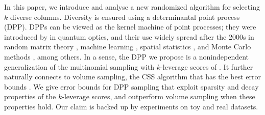 \documentclass[twoside,11pt]{book}
\numberwithin{theorem}{chapter}
\numberwithin{definition}{chapter}
\numberwithin{proposition}{chapter}
\numberwithin{corollary}{chapter}
\numberwithin{example}{chapter}
\numberwithin{lemma}{chapter}
\numberwithin{assumption}{chapter}
\begin{document}
In this paper, we introduce and analyse a new randomized algorithm for selecting $k$ diverse columns. Diversity is ensured using a determinantal point process (DPP). DPPs can be viewed as the kernel machine of point processes; they were introduced by \cite{Mac75} in quantum optics, and their use widely spread after the 2000s in random matrix theory \citep{Joh05}, machine learning \citep{KuTa12}, spatial statistics \citep{LaMoRu15}, and Monte Carlo methods \citep{BaHa16}, among others. In a sense, the DPP we propose is a nonindependent generalization of the multinomial sampling with $k$-leverage scores of \cite{BoMaDr09}. It further naturally connects to volume sampling, the CSS algorithm that has the best error bounds \citep{DRVW06}. We give error bounds for DPP sampling that exploit sparsity and decay properties of the $k$-leverage scores, and outperform volume sampling when these properties hold. Our claim is backed up by experiments on toy and real datasets.
\end{document}

